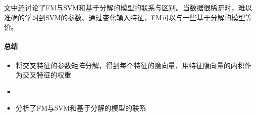 文中还讨论了FM与SVM和基于分解的模型的联系与区别。当数据很稀疏时，难以准确的学习到SVM的参数、通过变化输入特征，FM可以与一些基于分解的模型等价。


\paragraph{总结}

\begin{itemize}
	\item 将交叉特征的参数矩阵分解，得到每个特征的隐向量，用特征隐向量的内积作为交叉特征的权重
	\item {}
	\item 分析了FM与SVM和基于分解的模型的联系

\end{itemize}


